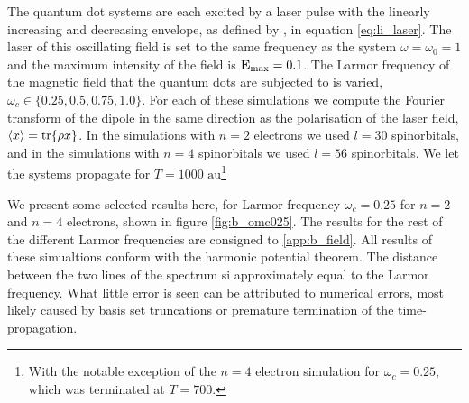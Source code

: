 The quantum dot systems are each excited by a laser pulse with the linearly increasing 
and decreasing envelope, as defined by \citeauthor{li2005time}\cite{li2005time}, in 
equation \autoref{eq:li_laser}. The laser of this oscillating field is set to the 
same frequency as the system $\omega=\omega_0=1$ and the maximum intensity of the field 
is $\vb{E}_\text{max} = 0.1$. The Larmor frequency of the magnetic field that the 
quantum dots are subjected to is varied, $\omega_c\in\{0.25, 0.5, 0.75, 1.0\}$.
For each of these simulations we compute the Fourier transform of the dipole in 
the same direction as the polarisation of the laser field, $\ev{x} =\tr{\rho x}$.
In the simulations with $n=2$ electrons we used $l=30$ spinorbitals,
and in the simulations with $n=4$ spinorbitals we used $l=56$ spinorbitals.
We let the systems propagate for $T = 1000 \text{ au}$\footnote{With the notable 
exception of the $n=4$ electron simulation for $\omega_c=0.25$, which was terminated 
at $T=700$.}

We present some selected results here, for Larmor frequency $\omega_c=0.25$ for 
$n=2$ and $n=4$ electrons, shown in figure \autoref{fig:b_omc025}. The results for 
the rest of the different Larmor frequencies are consigned to \autoref{app:b_field}.
All results of these simualtions conform with the harmonic potential theorem. The 
distance between the two lines of the spectrum si approximately equal to the 
Larmor frequency. What little error is seen can be attributed to numerical errors,
most likely caused by basis set truncations or premature termination of the
time-propagation.

